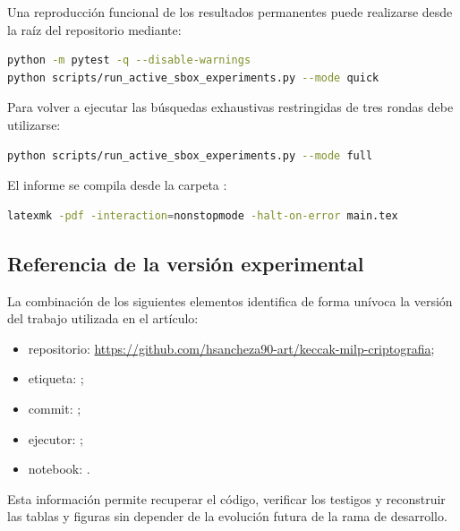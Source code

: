 Una reproducción funcional de los resultados permanentes puede
realizarse desde la raíz del repositorio mediante:

\begin{lstlisting}[language=bash]
python -m pytest -q --disable-warnings
python scripts/run_active_sbox_experiments.py --mode quick
\end{lstlisting}

Para volver a ejecutar las búsquedas exhaustivas restringidas de tres
rondas debe utilizarse:

\begin{lstlisting}[language=bash]
python scripts/run_active_sbox_experiments.py --mode full
\end{lstlisting}

El informe se compila desde la carpeta :

\begin{lstlisting}[language=bash]
latexmk -pdf -interaction=nonstopmode -halt-on-error main.tex
\end{lstlisting}

\subsection*{Referencia de la versión experimental}

La combinación de los siguientes elementos identifica de forma
unívoca la versión del trabajo utilizada en el artículo:

\begin{itemize}
    \item repositorio:
    \url{https://github.com/hsancheza90-art/keccak-milp-criptografia};

    \item etiqueta:
    ;

    \item commit:
    ;

    \item ejecutor:
    ;

    \item notebook:
    .
\end{itemize}

Esta información permite recuperar el código, verificar los testigos y
reconstruir las tablas y figuras sin depender de la evolución futura de
la rama de desarrollo.
